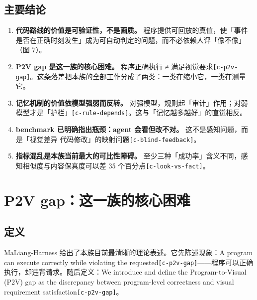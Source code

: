 \subsection{主要结论}

\begin{enumerate}
  \item \textbf{代码路线的价值是可验证性，不是画质。} 程序提供可回放的真值，使「事件是否在正确时刻发生」成为可自动判定的问题，而不必依赖人评「像不像」（图 7）。
  \item \textbf{P2V gap 是这一族的核心困难。} 程序正确执行 ≠ 满足视觉要求{\scriptsize\texttt{[c-\hspace{0pt}p2v-\hspace{0pt}gap]}}。这条落差把本族的全部工作分成了两类：一类在缩小它，一类在测量它。
  \item \textbf{记忆机制的价值依模型强弱而反转。} 对强模型，规则起「审计」作用；对弱模型才是「护栏」{\scriptsize\texttt{[c-\hspace{0pt}rule-\hspace{0pt}depends]}}。这与「记忆越多越好」的直觉相反。
  \item \textbf{benchmark 已明确指出瓶颈：agent 会看但改不对。} 这不是感知问题，而是「视觉差异  代码修改」的映射问题{\scriptsize\texttt{[c-\hspace{0pt}blind-\hspace{0pt}feedback]}}。
  \item \textbf{指标混乱是本族当前最大的可比性障碍。} 至少三种「成功率」含义不同，感知相似度与内容保真度可以差 35 个百分点{\scriptsize\texttt{[c-\hspace{0pt}look-\hspace{0pt}vs-\hspace{0pt}fact]}}。
\end{enumerate}


\section{P2V gap：这一族的核心困难}

\subsection{定义}

MaLiang-Harness 给出了本族目前最清晰的理论表述。它先陈述现象：A program can execute correctly while violating the requested{\scriptsize\texttt{[c-\hspace{0pt}p2v-\hspace{0pt}gap]}}——程序可以正确执行，却违背请求。随后定义：We introduce and define the Program-to-Visual (P2V) gap as the discrepancy between program-level correctness and visual requirement satisfaction{\scriptsize\texttt{[c-\hspace{0pt}p2v-\hspace{0pt}gap]}}。


